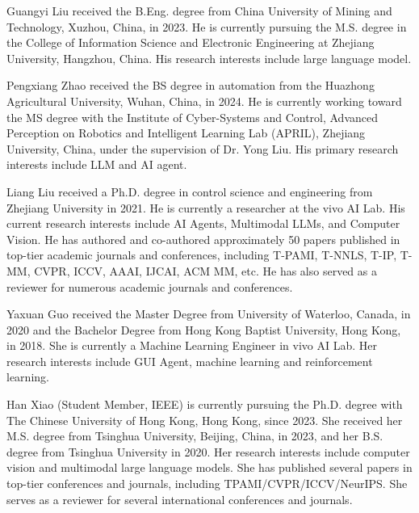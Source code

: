 \vspace{-40em}

\begin{IEEEbiography}{Guangyi Liu}
received the B.Eng. degree from China University of Mining and Technology, Xuzhou, China, in 2023. He is currently pursuing the M.S. degree in the College of Information Science and Electronic Engineering at Zhejiang University, Hangzhou, China. His research interests include large language model.
\end{IEEEbiography}

\begin{IEEEbiography}{Pengxiang Zhao}
received the BS degree in automation from the Huazhong Agricultural University, Wuhan, China, in 2024. He is currently working toward the MS degree with the Institute of Cyber-Systems and Control, Advanced Perception on Robotics and Intelligent Learning Lab (APRIL), Zhejiang University, China, under the supervision of Dr. Yong Liu. His primary research interests include LLM and AI agent.
\end{IEEEbiography}

\begin{IEEEbiography}{Liang Liu}
received a Ph.D. degree in control science and engineering from Zhejiang University in 2021. He is currently a researcher at the vivo AI Lab. His current research interests include AI Agents, Multimodal LLMs, and Computer Vision. He has authored and co-authored approximately 50 papers published in top-tier academic journals and conferences, including T-PAMI, T-NNLS, T-IP, T-MM, CVPR, ICCV, AAAI, IJCAI, ACM MM, etc. He has also served as a reviewer for numerous academic journals and conferences.
\end{IEEEbiography}

\begin{IEEEbiography}{Yaxuan Guo}
received the Master Degree from University of Waterloo, Canada, in 2020 and the Bachelor Degree from Hong Kong Baptist University, Hong Kong, in 2018. She is currently a Machine Learning Engineer in vivo AI Lab. Her research interests include GUI Agent, machine learning and reinforcement learning.
\end{IEEEbiography}

\begin{IEEEbiography}{Han Xiao}
(Student Member, IEEE) is currently pursuing the Ph.D. degree with The Chinese University of Hong Kong, Hong Kong, since 2023. She received her M.S. degree from Tsinghua University, Beijing, China, in 2023, and her B.S. degree from Tsinghua University in 2020. Her research interests include computer vision and multimodal large language models. She has published several papers in top-tier conferences and journals, including TPAMI/CVPR/ICCV/NeurIPS. She serves as a reviewer for several international conferences and journals.
\end{IEEEbiography}

